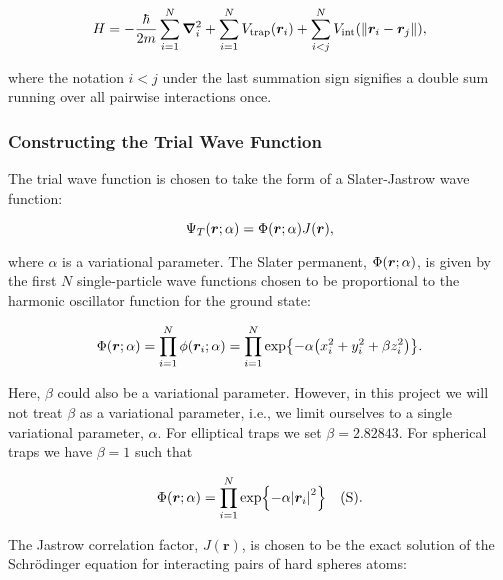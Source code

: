 \begin{equation}\label{eq:full_hamiltonian}
    H = - \frac{\hbar}{2m} \sum_{i=1}^{N} \grad^2_i + \sum_{i=1}^{N} V_\mathrm{trap}\qty(\bm{r}_i) + \sum_{i < j}^{N} V_\mathrm{int} \qty(\norm{\bm{r}_i - \bm{r}_j}),
\end{equation}

where the notation $i<j$ under the last summation sign signifies a double sum running over all pairwise interactions once. 

\subsubsection{Constructing the Trial Wave Function}

The trial wave function is chosen to take the form of a Slater-Jastrow wave function: 

\begin{equation}\label{eq:twf}
    \Psi_T \qty(\bm{r}; \alpha) = \Phi \qty(\bm{r}; \alpha) J \qty(\bm{r}),
\end{equation}

where $\alpha$ is a variational parameter. The Slater permanent, $\Phi \qty(\bm{r}; \alpha)$, is given by the first $N$ single-particle wave functions chosen to be proportional to the harmonic oscillator function for the ground state: 

\begin{equation}\label{eq:slater}
    \Phi \qty(\bm{r}; \alpha) = \prod_{i=1}^N \phi \qty(\bm{r}_i; \alpha) = \prod_{i=1}^N \exp{-\alpha \qty(x_i^2 + y_i^2 + \beta z_i^2)}.
\end{equation}

Here, $\beta$ could also be a variational parameter. However, in this project we will not treat $\beta$ as a variational parameter, i.e., we limit ourselves to a single variational parameter, $\alpha$. For elliptical traps we set $\beta=2.82843$. For spherical traps we have $\beta = 1$ such that

\begin{equation}\label{eq:slater_spherical}
    \Phi \qty(\bm{r}; \alpha) =  \prod_{i=1}^N \exp{-\alpha \abs{\bm{r}_i}^2} \quad \text{(S)}.
\end{equation} 

The Jastrow correlation factor, $J(\bm{r})$, is chosen to be the exact solution of the Schrödinger equation for interacting pairs of hard spheres atoms:

